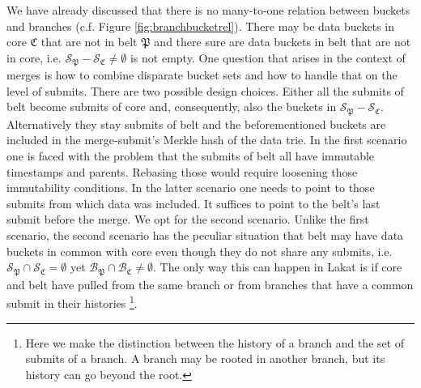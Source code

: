 We have already discussed that there is no many-to-one relation between buckets and branches (c.f. Figure \ref{fig:branchbucketrel}). There may be data buckets in core $\mathfrak C$ that are not in belt $\mathfrak P$ and there sure are data buckets in belt that are not in core, i.e. $\mathcal S_{\mathfrak P}-\mathcal S_{\mathfrak C}\neq \emptyset$ is not empty. 
One question that arises in the context of merges is how to combine disparate bucket sets and how to handle that on the level of submits. There are two possible design choices. Either all the submits of belt become submits of core and, consequently, also the buckets in $\mathcal S_{\mathfrak P}-\mathcal S_{\mathfrak C}$. Alternatively they stay submits of belt and the beforementioned buckets are included in the merge-submit's Merkle hash of the data trie. In the first scenario one is faced with the problem that the submits of belt all have immutable timestamps and parents. Rebasing those would require loosening those immutability conditions. In the latter scenario one needs to point to those submits from which data was included. It suffices to point to the belt's last submit before the merge. We opt for the second scenario. Unlike the first scenario, the second scenario has the peculiar situation that belt may have data buckets in common with core even though they do not share any submits, i.e. $\mathcal S_{\mathfrak P}\cap\mathcal S_{\mathfrak C}= \emptyset$ yet $\mathcal B_{\mathfrak P}\cap\mathcal B_{\mathfrak C}\neq \emptyset$. The only way this can happen in Lakat is if core and belt have pulled from the same branch or from branches that have a common submit in their histories \footnote{Here we make the distinction between the history of a branch and the set of submits of a branch. A branch may be rooted in another branch, but its history can go beyond the root.}. 
